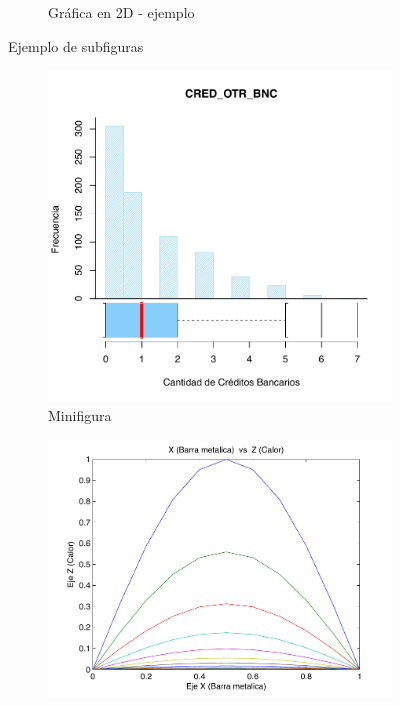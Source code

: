 \documentclass[a4paper, 11pt]{article}
\begin{document}
\begin{figure}[ht]
\begin{subfigure}[b]{0.49\textwidth}
                \caption{Gráfica en 2D - ejemplo}
                \label{fig: Gráfica en 2D - ejemplo}
            \end{subfigure}
                \caption{Ejemplo de subfiguras}
                \label{fig: Ejemplo de subfiguras}
        \end{figure}


        \begin{figure}[ht]
            \centering
            \begin{subfigure}[b]{0.3\textwidth}
                \centering
                \includegraphics[width=\textwidth]{04_ENTORNOS_FLOTANTES/images/mifigura.pdf}
                \caption{Minifigura}
                \label{fig: minifigura}
            \end{subfigure}
            \hfill 
            \begin{subfigure}[b]{0.3\textwidth}
                \centering
                \includegraphics[width=\textwidth]{04_ENTORNOS_FLOTANTES/images/Grafica2D.pdf}

\end{subfigure}
\end{figure}
\end{document}
